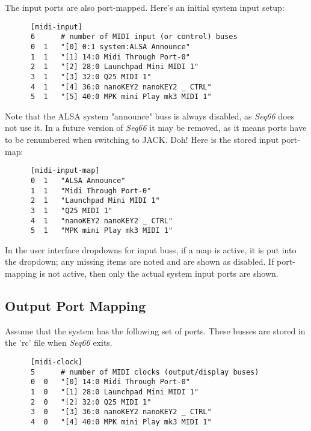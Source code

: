    The input ports are also port-mapped.  Here's an
   initial system input setup:

   \begin{verbatim}
      [midi-input]
      6      # number of MIDI input (or control) buses
      0  1   "[0] 0:1 system:ALSA Announce"
      1  1   "[1] 14:0 Midi Through Port-0"
      2  1   "[2] 28:0 Launchpad Mini MIDI 1"
      3  1   "[3] 32:0 Q25 MIDI 1"
      4  1   "[4] 36:0 nanoKEY2 nanoKEY2 _ CTRL"
      5  1   "[5] 40:0 MPK mini Play mk3 MIDI 1"
   \end{verbatim}

   Note that the ALSA system "announce" buss is always disabled,
   as \textsl{Seq66} does not use it.
   In a future version of \textsl{Seq66} it may be removed, as it means ports
   have to be renumbered when switching to JACK. Doh!
   Here is the stored input port-map:

   \begin{verbatim}
      [midi-input-map]
      0  1   "ALSA Announce"
      1  1   "Midi Through Port-0"
      2  1   "Launchpad Mini MIDI 1"
      3  1   "Q25 MIDI 1"
      4  1   "nanoKEY2 nanoKEY2 _ CTRL"
      5  1   "MPK mini Play mk3 MIDI 1"
   \end{verbatim}

   In the user interface dropdowns for input buss, if a map is active, it is
   put into the dropdown; any missing items are noted and are shown as
   disabled.
   If port-mapping is not active, then only the actual system input ports are
   shown.

\subsection{Output Port Mapping}
\label{subsec:output_port_mapping}

   Assume that the system has the following set of ports.  These busses are
   stored in the 'rc' file when \textsl{Seq66} exits.

   \begin{verbatim}
      [midi-clock]
      5      # number of MIDI clocks (output/display buses)
      0  0   "[0] 14:0 Midi Through Port-0"
      1  0   "[1] 28:0 Launchpad Mini MIDI 1"
      2  0   "[2] 32:0 Q25 MIDI 1"
      3  0   "[3] 36:0 nanoKEY2 nanoKEY2 _ CTRL"
      4  0   "[4] 40:0 MPK mini Play mk3 MIDI 1"
   \end{verbatim}

